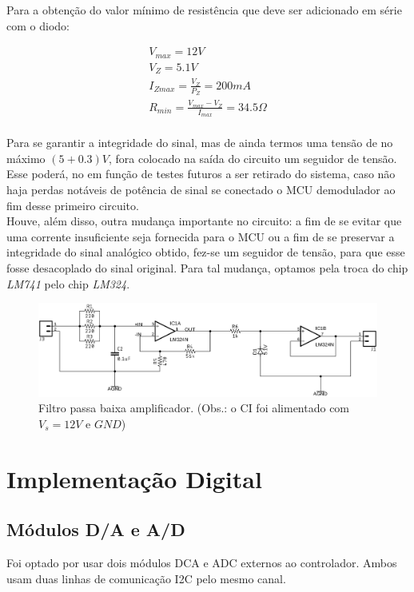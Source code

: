 \documentclass[12pt,a4paper]{report}
\begin{document}
		Para a obtenção do valor mínimo de resistência que deve ser adicionado em série com o diodo:
		
		\begin{center}
			\begin{gather}
				V_{max} = 12V\\
				V_Z = 5.1V\\
				I_{Zmax} = \frac{V_Z}{P_Z} = 200mA\\
				R_{min} = \frac{V_{max} - V_Z}{I_{max}} = 34.5\Omega\\
			\end{gather}
		\end{center}
		
		Para se garantir a integridade do sinal, mas de ainda termos uma tensão de no máximo $(5 + 0.3)V$, fora colocado na saída do circuito um seguidor de tensão. Esse poderá, no em função de testes futuros a ser retirado do sistema, caso não haja perdas notáveis de potência de sinal se conectado o MCU demodulador ao fim desse primeiro circuito.\\
		
		Houve, além disso, outra mudança importante no circuito: a fim de se evitar que uma corrente insuficiente seja fornecida para o MCU ou a fim de se preservar a integridade do sinal analógico obtido, fez-se um seguidor de tensão, para que esse fosse desacoplado do sinal original. Para tal mudança, optamos pela troca do chip {\it LM741} pelo chip {\it LM324}.
		
		\begin{figure}[h]
			\includegraphics[width=\linewidth]{corrected_filter.png}
			\caption{Filtro passa baixa amplificador. (Obs.: o CI foi alimentado com $V_s = 12V$ e $GND$)}
			\label{fig:filter}
		\end{figure}
			
	\chapter{Implementação Digital}
	
	\section{Módulos D/A e A/D}
	Foi optado por usar dois módulos DCA e ADC externos ao controlador. Ambos usam duas linhas de comunicação I2C pelo mesmo canal.\\
	
\end{document}

